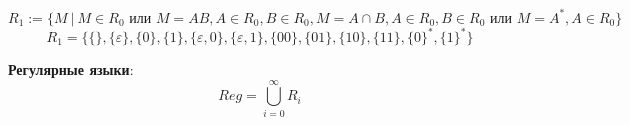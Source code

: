 $$R_1:=\{M \ | \ M\in R_0 \text{ или } M=AB, A\in R_0, B\in R_0, M=A\cap B, A\in R_0, B\in R_0 \text{ или } M=A^*, A\in R_0\}$$
$$R_1=\{\{\}, \{\varepsilon\}, \{0\}, \{1\}, \{\varepsilon, 0\}, \{\varepsilon, 1\}, \{00\}, \{01\}, \{10\}, \{11\}, \{0\}^*, \{1\}^* \}$$

\begin{definition}
    \textbf{Регулярные языки}:
    $$Reg=\bigcup_{i=0}^\infty R_i$$
\end{definition}

